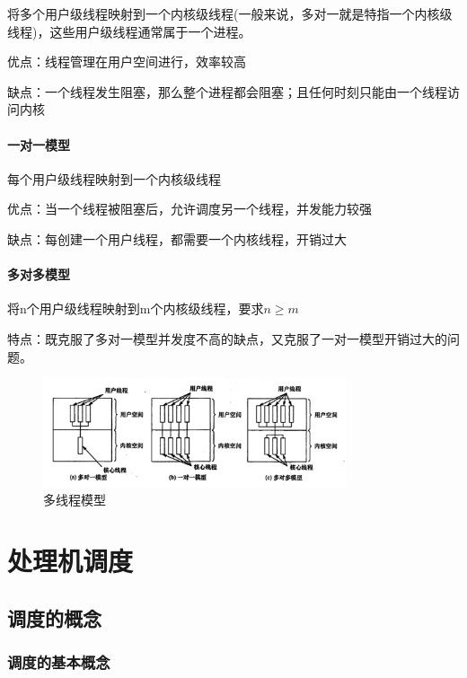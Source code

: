     将多个用户级线程映射到一个内核级线程(一般来说，多对一就是特指一个内核级线程)，这些用户级线程通常属于一个进程。

    优点：线程管理在用户空间进行，效率较高

    缺点：一个线程发生阻塞，那么整个进程都会阻塞；且任何时刻只能由一个线程访问内核

\paragraph{一对一模型}

    每个用户级线程映射到一个内核级线程

    优点：当一个线程被阻塞后，允许调度另一个线程，并发能力较强

    缺点：每创建一个用户线程，都需要一个内核线程，开销过大

\paragraph{多对多模型}

    将n个用户级线程映射到m个内核级线程，要求$n \geq m$

    特点：既克服了多对一模型并发度不高的缺点，又克服了一对一模型开销过大的问题。

\begin{figure}[!htbp]
    \centering
    \includegraphics[width=0.8\textwidth]{image/chapter02/多线程模型.png}
    \caption{多线程模型}
\end{figure}

\section{处理机调度}

\subsection{调度的概念}

\subsubsection{调度的基本概念}

